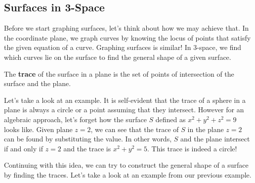 \documentclass[../../../main.tex]{subfiles}
\begin{document}
\subsection{Surfaces in 3-Space}

Before we start graphing surfaces, let's think about how we may
achieve that. In the coordinate plane, we graph curves by knowing
the locus of points that satisfy the given equation of a curve.
Graphing surfaces is similar! In 3-space, we find which curves
lie on the surface to find the general shape of a given surface.

\begin{definition}{}{}
The \textbf{trace} of the surface in a plane is the set of points
of intersection of the surface and the plane.
\end{definition}

Let's take a look at an example. It is self-evident that the trace
of a sphere in a plane is always a circle or a point assuming that
they intersect. However for an algebraic approach, let's forget
how the surface $S$ defined as $x^2 + y^2 + z^2 = 9$ looks like.
Given plane $z = 2$, we can see that the trace of $S$ in the plane
$z = 2$ can be found by substituting the value. In other words,
$S$ and the plane intersect if and only if $z = 2$ and the trace
is $x^2 + y^2 = 5$. This trace is indeed a circle!

\begin{figure}[H]
\centering
{}
\end{figure}

Continuing with this idea, we can try to construct the general
shape of a surface by finding the traces. Let's take a look at
an example from our previous example.
\end{document}
